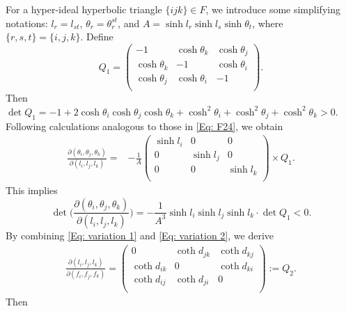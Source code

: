 \documentclass[12pt]{amsart}
\theoremstyle{definition}
\begin{document}
For a hyper-ideal hyperbolic triangle $\{ijk\}\in F$,
we introduce some simplifying notations: $l_r=l_{st}$, $\theta_r=\theta^{st}_r$, and $A=\sinh l_r\sinh l_s\sinh \theta_t$, where $\{r,s,t\}=\{i,j,k\}$.
Define
\begin{equation}\label{Eq: Q_1}
Q_1=\left(
   \begin{array}{ccc}
     -1 & \cosh\theta_k & \cosh\theta_j \\
     \cosh\theta_k & -1 & \cosh\theta_i \\
     \cosh\theta_j & \cosh\theta_i & -1 \\
   \end{array}
 \right).
\end{equation}
Then $\det Q_1=-1+2\cosh \theta_i\cosh \theta_j\cosh \theta_k+\cosh^2 \theta_i+\cosh^2 \theta_j+\cosh^2 \theta_k>0$.
Following calculations analogous to those in \eqref{Eq: F24}, we obtain
\begin{equation*}
\begin{aligned}
\frac{\partial(\theta_i,\theta_j,\theta_k)}
{\partial(l_i,l_j,l_k)}
=&-\frac{1}{A}
 \left(
   \begin{array}{ccc}
     \sinh l_i & 0 & 0 \\
     0 & \sinh l_j & 0 \\
     0 & 0 & \sinh l_k \\
   \end{array}
 \right)\times
 Q_1.
\end{aligned}
\end{equation*}
This implies
\begin{equation}\label{Eq: F35}
\det\bigg(\frac{\partial(\theta_i,\theta_j,\theta_k)}
{\partial(l_i,l_j,l_k)}\bigg)
=-\frac{1}{A^3}\sinh l_i\sinh l_j\sinh l_k\cdot \det Q_1<0.
\end{equation}
By combining \eqref{Eq: variation 1} and \eqref{Eq: variation 2}, we derive
\begin{equation}\label{Eq: Q_2}
\begin{aligned}
\frac{\partial(l_i,l_j,l_k)}
{\partial(f_i,f_j,f_k)}=
\left(
   \begin{array}{ccc}
     0 & \coth d_{jk} & \coth d_{kj} \\
     \coth d_{ik} & 0 & \coth d_{ki} \\
     \coth d_{ij} & \coth d_{ji} & 0 \\
   \end{array}
 \right)
:=Q_2.
\end{aligned}
\end{equation}
Then
\end{document}
